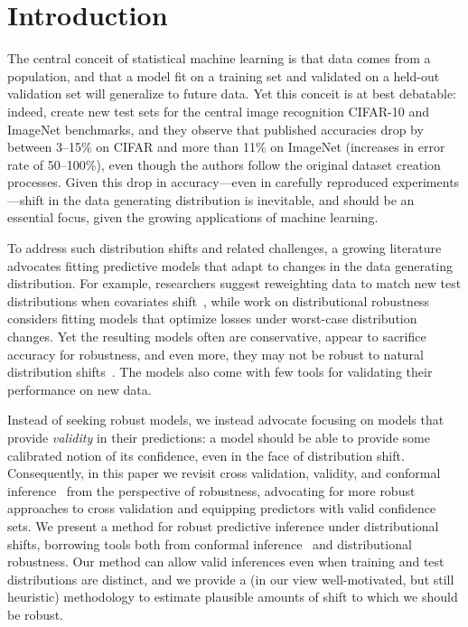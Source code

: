 
\section{Introduction}
\label{sec:intro}

The central conceit of statistical machine learning is that data comes from a
population, and that a model fit on a training set and validated on a held-out
validation set will generalize to future data.  Yet this conceit is at
best debatable: indeed, \citet*{RechtRoScSh19} create new test sets
for the central image recognition CIFAR-10 and ImageNet benchmarks, and
they observe
that published accuracies drop by between 3--15\% on CIFAR and more than 11\% on
ImageNet (increases in error rate of 50--100\%), even though the authors follow
the original dataset creation processes. Given this drop in accuracy---even in
carefully reproduced experiments---shift in the data generating distribution is
inevitable, and should be an essential focus, given the growing applications of
machine learning.

To address such distribution shifts and related challenges, a growing
literature advocates fitting predictive models that adapt to changes in the
data generating distribution. For example, researchers suggest reweighting
data to match new test distributions when covariates
shift~\cite{SugiyamaKrMu07}, while work
on distributional robustness~\cite{BertsimasGuKa18,
  DuchiNa21} considers fitting models
that optimize losses under worst-case distribution changes.  Yet the
resulting models often are conservative, appear to sacrifice
accuracy for robustness, and even more, they may not be robust to
natural distribution shifts~\cite{TaoriDaShCaReSc19}. The models also come
with few tools for validating their performance on new data.

Instead of seeking robust models, we instead advocate focusing on models
that provide \emph{validity} in their predictions: a model
should be able to provide some calibrated notion of its confidence, even in
the face of distribution shift. Consequently, in this paper we revisit cross
validation, validity, and conformal inference~\cite{VovkGaSh05} from the
perspective of robustness, advocating for more robust approaches to cross
validation and equipping predictors with valid confidence sets. We present a
method for robust predictive inference under distributional shifts,
borrowing tools both from conformal inference~\cite{VovkGaSh05} and
distributional robustness. Our method can allow valid inferences even when
training and test distributions are distinct, and we provide a (in our view
well-motivated, but still heuristic) methodology to estimate plausible
amounts of shift to which we should be robust.

